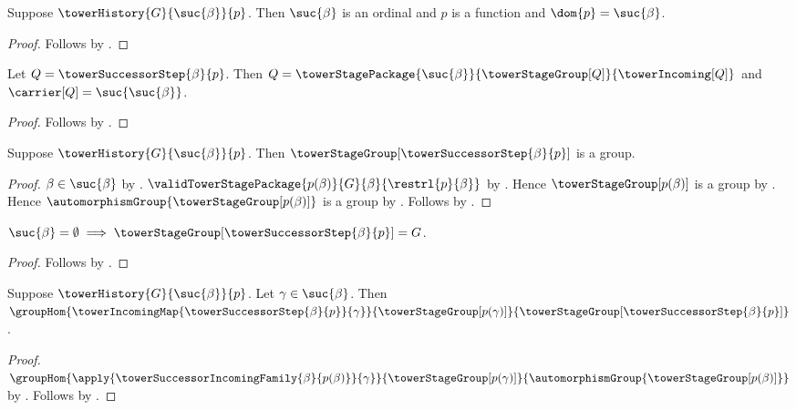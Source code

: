 \begin{proposition}\label{tower_successor_step_history_data}
    Suppose $\towerHistory{G}{\suc{\beta}}{p}$.
    Then $\suc{\beta}$ is an ordinal and
        $p$ is a function and $\dom{p}=\suc{\beta}$.
\end{proposition}
\begin{proof}
    Follows by
        .
\end{proof}

\begin{proposition}\label{tower_successor_step_exact_data}
    Let $Q=\towerSuccessorStep{\beta}{p}$.
    Then $Q=\towerStagePackage{\suc{\beta}}
            {\towerStageGroup[Q]}{\towerIncoming[Q]}$ and
        $\carrier[Q]=\suc{\suc{\beta}}$.
\end{proposition}
\begin{proof}
    Follows by
        .
\end{proof}

\begin{proposition}\label{tower_successor_step_group_is_group}
    Suppose $\towerHistory{G}{\suc{\beta}}{p}$.
    Then $\towerStageGroup[\towerSuccessorStep{\beta}{p}]$ is a group.
\end{proposition}
\begin{proof}
    $\beta\in\suc{\beta}$ by .
    $\validTowerStagePackage
        {p(\beta)}{G}{\beta}{\restrl{p}{\beta}}$ by
        .
    Hence $\towerStageGroup[p(\beta)]$ is a group by
        .
    Hence $\automorphismGroup{\towerStageGroup[p(\beta)]}$ is a group by
        .
    Follows by .
\end{proof}

\begin{proposition}\label{tower_successor_step_base_vacuous}
    $\suc{\beta}=\emptyset\implies
        \towerStageGroup[\towerSuccessorStep{\beta}{p}]=G$.
\end{proposition}
\begin{proof}
    Follows by .
\end{proof}

\begin{proposition}\label{tower_successor_step_incoming_hom}
    Suppose $\towerHistory{G}{\suc{\beta}}{p}$.
    Let $\gamma\in\suc{\beta}$.
    Then $\groupHom
        {\towerIncomingMap{\towerSuccessorStep{\beta}{p}}{\gamma}}
        {\towerStageGroup[p(\gamma)]}
        {\towerStageGroup[\towerSuccessorStep{\beta}{p}]}$.
\end{proposition}
\begin{proof}
    $\groupHom
        {\apply{\towerSuccessorIncomingFamily{\beta}{p(\beta)}}{\gamma}}
        {\towerStageGroup[p(\gamma)]}
        {\automorphismGroup{\towerStageGroup[p(\beta)]}}$ by
        .
    Follows by
        .
\end{proof}

